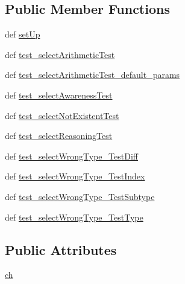 \subsection*{Public Member Functions}
\begin{DoxyCompactItemize}
\item 
def \hyperlink{classcognitive__test__chooser__tests_1_1CognitiveTestChooserTests_a6ac5b7cf1165d1d74696c0bcbb3dc4d9}{set\-Up}
\item 
def \hyperlink{classcognitive__test__chooser__tests_1_1CognitiveTestChooserTests_afdff8c873450c132f7852259335a3d35}{test\-\_\-select\-Arithmetic\-Test}
\item 
def \hyperlink{classcognitive__test__chooser__tests_1_1CognitiveTestChooserTests_aeae3d593b949f387d83f6b05c95b889a}{test\-\_\-select\-Arithmetic\-Test\-\_\-default\-\_\-params}
\item 
def \hyperlink{classcognitive__test__chooser__tests_1_1CognitiveTestChooserTests_ab58155187716a35afd95cfd2109afc3a}{test\-\_\-select\-Awareness\-Test}
\item 
def \hyperlink{classcognitive__test__chooser__tests_1_1CognitiveTestChooserTests_ab04e0c115b21de7a8ceb32b964aa0e17}{test\-\_\-select\-Not\-Existent\-Test}
\item 
def \hyperlink{classcognitive__test__chooser__tests_1_1CognitiveTestChooserTests_ad1ee26f71eea5ee9d203d6b8893fe0fd}{test\-\_\-select\-Reasoning\-Test}
\item 
def \hyperlink{classcognitive__test__chooser__tests_1_1CognitiveTestChooserTests_a0c2862ece018b3059d87170253d85508}{test\-\_\-select\-Wrong\-Type\-\_\-\-Test\-Diff}
\item 
def \hyperlink{classcognitive__test__chooser__tests_1_1CognitiveTestChooserTests_a8e2a9432c4b3b0409d1c5d84cf9f14ab}{test\-\_\-select\-Wrong\-Type\-\_\-\-Test\-Index}
\item 
def \hyperlink{classcognitive__test__chooser__tests_1_1CognitiveTestChooserTests_a88c406e3607cc18cda4c397cf81f3671}{test\-\_\-select\-Wrong\-Type\-\_\-\-Test\-Subtype}
\item 
def \hyperlink{classcognitive__test__chooser__tests_1_1CognitiveTestChooserTests_a79d99f1dc4424b558916d2c46cd0f09c}{test\-\_\-select\-Wrong\-Type\-\_\-\-Test\-Type}
\end{DoxyCompactItemize}
\subsection*{Public Attributes}
\begin{DoxyCompactItemize}
\item 
\hyperlink{classcognitive__test__chooser__tests_1_1CognitiveTestChooserTests_ac6866e441eb04b7b7819d8b166f3682c}{ch}
\end{DoxyCompactItemize}


